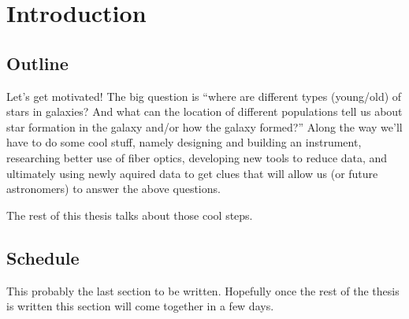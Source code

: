 \chapter[Introduction]{Introduction}
\label{chap:intro}


\clearpage
\section{Outline}
Let's get motivated! The big question is ``where are different types
(young/old) of stars in galaxies? And what can the location of different
populations tell us about star formation in the galaxy and/or how the galaxy
formed?'' Along the way we'll have to do some cool stuff, namely designing and
building an instrument, researching better use of fiber optics, developing new
tools to reduce data, and ultimately using newly aquired data to get clues
that will allow us (or future astronomers) to answer the above questions.

The rest of this thesis talks about those cool steps.

\section{Schedule}
This probably the last section to be written. Hopefully once the rest of the
thesis is written this section will come together in a few days.

\clearpage
{} %



